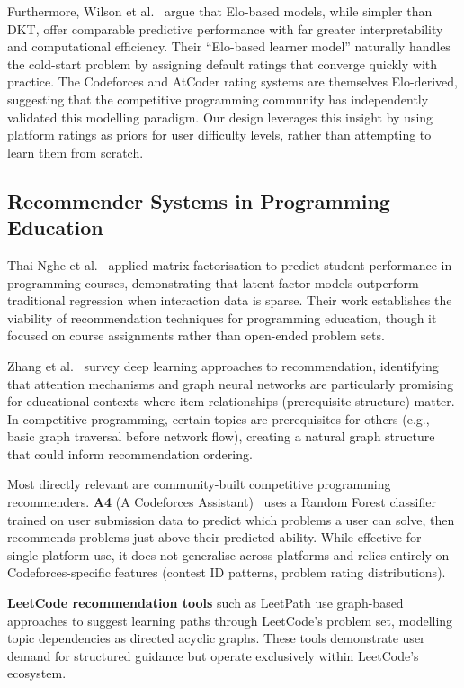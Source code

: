 \documentclass[12pt,a4paper]{article}
\begin{document}
Furthermore, Wilson et al.~\cite{wilson2019} argue that Elo-based models, while simpler than DKT, offer comparable predictive performance with far greater interpretability and computational efficiency. Their ``Elo-based learner model'' naturally handles the cold-start problem by assigning default ratings that converge quickly with practice. The Codeforces and AtCoder rating systems are themselves Elo-derived, suggesting that the competitive programming community has independently validated this modelling paradigm. Our design leverages this insight by using platform ratings as priors for user difficulty levels, rather than attempting to learn them from scratch.

\subsection{Recommender Systems in Programming Education}

Thai-Nghe et al.~\cite{thainghe2010} applied matrix factorisation to predict student performance in programming courses, demonstrating that latent factor models outperform traditional regression when interaction data is sparse. Their work establishes the viability of recommendation techniques for programming education, though it focused on course assignments rather than open-ended problem sets.

Zhang et al.~\cite{zhang2019} survey deep learning approaches to recommendation, identifying that attention mechanisms and graph neural networks are particularly promising for educational contexts where item relationships (prerequisite structure) matter. In competitive programming, certain topics are prerequisites for others (e.g., basic graph traversal before network flow), creating a natural graph structure that could inform recommendation ordering.

Most directly relevant are community-built competitive programming recommenders. \textbf{A4} (A Codeforces Assistant)~\cite{ahmed2023} uses a Random Forest classifier trained on user submission data to predict which problems a user can solve, then recommends problems just above their predicted ability. While effective for single-platform use, it does not generalise across platforms and relies entirely on Codeforces-specific features (contest ID patterns, problem rating distributions).

\textbf{LeetCode recommendation tools} such as LeetPath use graph-based approaches to suggest learning paths through LeetCode's problem set, modelling topic dependencies as directed acyclic graphs. These tools demonstrate user demand for structured guidance but operate exclusively within LeetCode's ecosystem.
\end{document}
